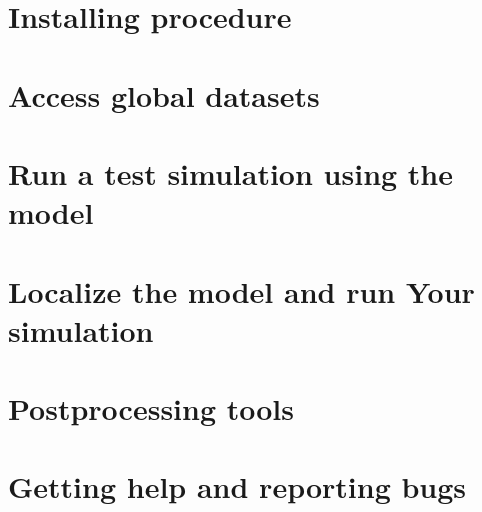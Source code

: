 \documentclass[11pt,twoside,a4paper]{report}
\begin{document}
\chapter{Installing procedure}


\newpage

\chapter{Access global datasets}

\newpage

\chapter{Run a test simulation using the model}

\newpage

\chapter{Localize the model and run Your simulation}

\newpage

\chapter{Postprocessing tools}

\newpage

\chapter{Getting help and reporting bugs}

\newpage

\cleardoublepage



\cleardoublepage

\evensidemargin=1.0cm
\oddsidemargin=1.5cm
\end{document}
